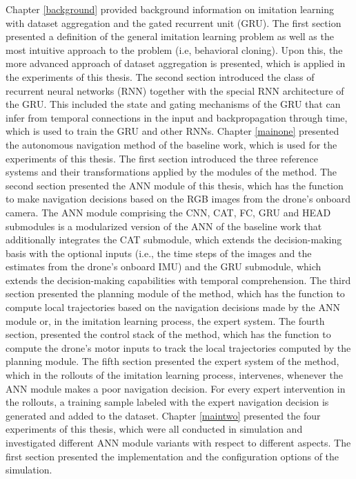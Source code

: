 Chapter \ref{background} provided background information 
on imitation learning with dataset aggregation and the gated recurrent unit (GRU).
The first section presented a definition of the general imitation learning problem
as well as the most intuitive approach to the problem (i.e, behavioral cloning).
Upon this, the more advanced approach of dataset aggregation is presented,
which is applied in the experiments of this thesis.
The second section introduced the class of recurrent neural networks (RNN)
together with the special RNN architecture of the GRU.
This included the state and gating mechanisms of the GRU that can infer from temporal connections in the input
and backpropagation through time, which is used to train the GRU and other RNNs.
Chapter \ref{mainone} presented the autonomous navigation method of the baseline work,
which is used for the experiments of this thesis.
The first section introduced the three reference systems 
and their transformations applied by the modules of the method.
The second section presented the ANN module of this thesis,
which has the function to make navigation decisions based on the RGB images from the drone's onboard camera.
The ANN module comprising the CNN, CAT, FC, GRU and HEAD submodules
is a modularized version of the ANN of the baseline work
that additionally integrates the CAT submodule,
which extends the decision-making basis with the optional inputs
(i.e., the time steps of the images and the estimates from the drone's onboard IMU)
and the GRU submodule,
which extends the decision-making capabilities with temporal comprehension.
The third section presented the planning module of the method,
which has the function to compute local trajectories based on the navigation decisions made by
the ANN module or, in the imitation learning process, the expert system.
The fourth section, presented the control stack of the method,
which has the function to compute the drone's motor inputs 
to track the local trajectories computed by the planning module.
The fifth section presented the expert system of the method,
which in the rollouts of the imitation learning process,
intervenes, whenever the ANN module makes a poor navigation decision.
For every expert intervention in the rollouts, a training sample 
labeled with the expert navigation decision is generated and added to the dataset.
Chapter \ref{maintwo} presented the four experiments of this thesis,
which were all conducted in simulation and investigated different ANN module variants with respect to different aspects.
The first section presented the implementation and the configuration options of the simulation.
